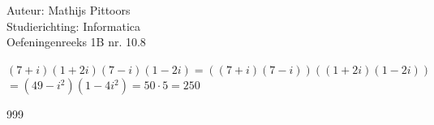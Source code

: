 \documentclass[a4paper]{article}
\begin{document}
  
\noindent \large Auteur: Mathijs Pittoors \\
\noindent \large Studierichting: Informatica\\
\noindent \large Oefeningenreeks 1B nr. 10.8\\

\medskip

\normalsize

$(7+i)(1+2i)(7-i)(1-2i) = ((7+i)(7-i))((1+2i)(1-2i))$ \\

$=(49-i^2)(1-4i^2) = 50 \cdot 5 = 250$


\begin{thebibliography}{999}
\end{thebibliography}
\end{document}
